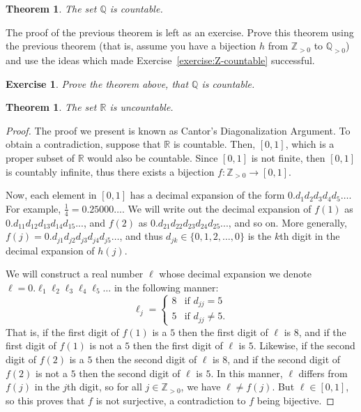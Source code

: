 \documentclass{book}
\newcounter{ekcounter}%
\theoremstyle{ekimcustom}
\newtheorem{theorem}[ekcounter]{Theorem}
\newtheorem{exercise}[ekcounter]{Exercise}
\begin{document}
\begin{theorem}
The set $\mathbb{Q}$ is countable.
\end{theorem}
The proof of the previous theorem is left as an exercise. Prove this theorem using the previous theorem (that is, assume you have a bijection $h$ from $\mathbb{Z}_{>0}$ to $\mathbb{Q}_{>0}$) and use the ideas which made Exercise~\ref{exercise:Z-countable} successful.
\begin{exercise}
Prove the theorem above, that $\mathbb{Q}$ is countable.
\end{exercise}

\begin{theorem}
The set $\mathbb{R}$ is uncountable.
\end{theorem}
\begin{proof}
The proof we present is known as Cantor's Diagonalization Argument. To obtain a contradiction, suppose that $\mathbb{R}$ is countable. Then, $[0,1]$, which is a proper subset of $\mathbb{R}$ would also be countable. Since $[0,1]$ is not finite, then $[0,1]$ is countably infinite, thus there exists a bijection $f : \mathbb{Z}_{>0} \to [0,1]$.

Now, each element in $[0,1]$ has a decimal expansion of the form $0.d_1d_2d_3d_4d_5\dots$. For example, $\frac14 = 0.25000\dots$.
We will write out the decimal expansion of $f(1)$ as $0.d_{11}d_{12}d_{13}d_{14}d_{15}...$, and $f(2)$ as $0.d_{21}d_{22}d_{23}d_{24}d_{25}...$, and so on. More generally, $f(j)=0.d_{j1}d_{j2}d_{j3}d_{j4}d_{j5}\dots$, and thus $d_{jk} \in \{0,1,2,\dots,0\}$ is the $k$th digit in the decimal expansion of $h(j)$.

We will construct a real number $\ell$ whose decimal expansion we denote $\ell = 0.\ell_1\ell_2\ell_3\ell_4\ell_5\dots$ in the following manner:
\[
\ell_j =
\left\{
\begin{array}{ll}
8 & \text{if } d_{jj} = 5\\
5 & \text{if } d_{jj} \not=5.
\end{array}
\right.
\]
That is, if the first digit of $f(1)$ is a $5$ then the first digit of $\ell$ is $8$, and if the first digit of $f(1)$ is not a $5$ then the first digit of $\ell$ is $5$.
Likewise, if the second digit of $f(2)$ is a $5$ then the second digit of $\ell$ is $8$, and if the second digit of $f(2)$ is not a $5$ then the second digit of $\ell$ is $5$. In this manner, $\ell$ differs from $f(j)$ in the $j$th digit, so for all $j \in \mathbb{Z}_{>0}$, we have $\ell \not= f(j)$. But $\ell \in [0,1]$, so this proves that $f$ is not surjective, a contradiction to $f$ being bijective.
\end{proof}
\end{document}

